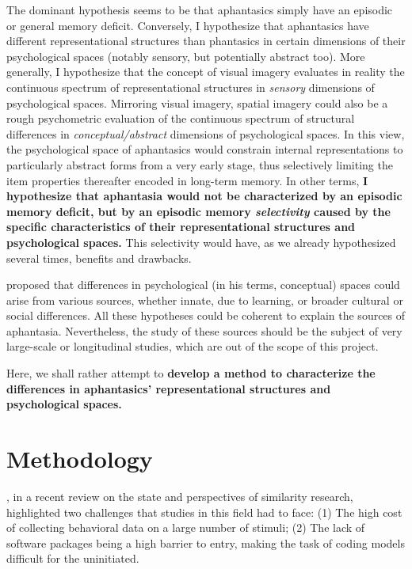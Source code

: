 \documentclass[
  authoryear]{elsarticle}
\begin{document}
The dominant hypothesis seems to be that aphantasics simply have an
episodic or general memory deficit. Conversely, I hypothesize that
aphantasics have different representational structures than phantasics
in certain dimensions of their psychological spaces (notably sensory,
but potentially abstract too). More generally, I hypothesize that the
concept of visual imagery evaluates in reality the continuous spectrum
of representational structures in \emph{sensory} dimensions of
psychological spaces. Mirroring visual imagery, spatial imagery could
also be a rough psychometric evaluation of the continuous spectrum of
structural differences in \emph{conceptual/abstract} dimensions of
psychological spaces. In this view, the psychological space of
aphantasics would constrain internal representations to particularly
abstract forms from a very early stage, thus selectively limiting the
item properties thereafter encoded in long-term memory. In other terms,
\textbf{I hypothesize that aphantasia would not be characterized by an
episodic memory deficit, but by an episodic memory \emph{selectivity}
caused by the specific characteristics of their representational
structures and psychological spaces.} This selectivity would have, as we
already hypothesized several times, benefits and drawbacks.

\citet{gardenforsConceptualSpacesFramework2004} proposed that
differences in psychological (in his terms, conceptual) spaces could
arise from various sources, whether innate, due to learning, or broader
cultural or social differences. All these hypotheses could be coherent
to explain the sources of aphantasia. Nevertheless, the study of these
sources should be the subject of very large-scale or longitudinal
studies, which are out of the scope of this project.

Here, we shall rather attempt to \textbf{develop a method to
characterize the differences in aphantasics' representational structures
and psychological spaces.}

\section{Methodology}\label{methodology}

\citet{roads2024}, in a recent review on the state and perspectives of
similarity research, highlighted two challenges that studies in this
field had to face: (1) The high cost of collecting behavioral data on a
large number of stimuli; (2) The lack of software packages being a high
barrier to entry, making the task of coding models difficult for the
uninitiated.
\end{document}
